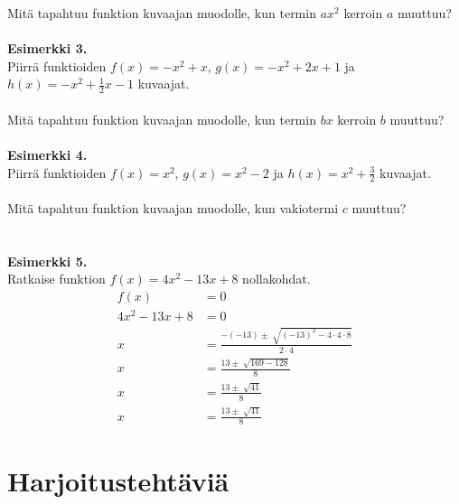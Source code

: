 Mitä tapahtuu funktion kuvaajan muodolle, kun termin $ax^2$ kerroin $a$ muuttuu? \\ \\

\textbf{Esimerkki 3.} \\
Piirrä funktioiden $f(x)=-x^2+x$, $g(x)=-x^2+2x+1$ ja $h(x)=-x^2+\frac{1}{2}x-1$ kuvaajat. \\
\missingfigure \\
Mitä tapahtuu funktion kuvaajan muodolle, kun termin $bx$ kerroin $b$ muuttuu? \\ \\

\textbf{Esimerkki 4.} \\
Piirrä funktioiden $f(x)=x^2$, $g(x)=x^2-2$ ja $h(x)=x^2+\frac{3}{2}$ kuvaajat. \\ \\
Mitä tapahtuu funktion kuvaajan muodolle, kun vakiotermi $c$ muuttuu? \\ \\

\missingfigure \\

\textbf{Esimerkki 5.} \\
Ratkaise funktion $f(x)=4x^2-13x+8$ nollakohdat.
\begin{align*}
f(x)&=0 \\
4x^2-13x+8&=0 \\
x&=\frac{-(-13) \pm \sqrt[]{(-13)^2-4 \cdot 4 \cdot 8}}{2 \cdot 4} \\
x&=\frac{13 \pm \sqrt[]{169-128}}{8} \\
x&=\frac{13 \pm \sqrt[]{41}}{8} \\
x&=\frac{13 \pm \sqrt[]{41}}{8}
\end{align*}

\section{Harjoitustehtäviä}

